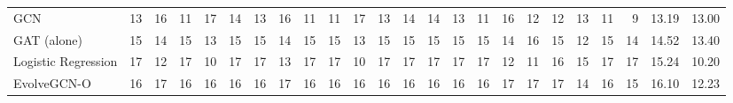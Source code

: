 \begin{table}
\begin{tabular}{lrrrrrrrrrrrrrrrrrrrrrll}
GCN & 13 & 16 & 11 & 17 & 14 & 13 & 16 & 11 & 11 & 17 & 13 & 14 & 14 & 13 & 11 & 16 & 12 & 12 & 13 & 11 & 9 & 13.19 & 13.00 \\
GAT (alone) & 15 & 14 & 15 & 13 & 15 & 15 & 14 & 15 & 15 & 13 & 15 & 15 & 15 & 15 & 15 & 14 & 16 & 15 & 12 & 15 & 14 & 14.52 & 13.40 \\
Logistic Regression & 17 & 12 & 17 & 10 & 17 & 17 & 13 & 17 & 17 & 10 & 17 & 17 & 17 & 17 & 17 & 12 & 11 & 16 & 15 & 17 & 17 & 15.24 & 10.20 \\
EvolveGCN-O & 16 & 17 & 16 & 16 & 16 & 16 & 17 & 16 & 16 & 16 & 16 & 16 & 16 & 16 & 16 & 17 & 17 & 17 & 14 & 16 & 15 & 16.10 & 12.23 \\
\bottomrule
\end{tabular}
\end{table}
